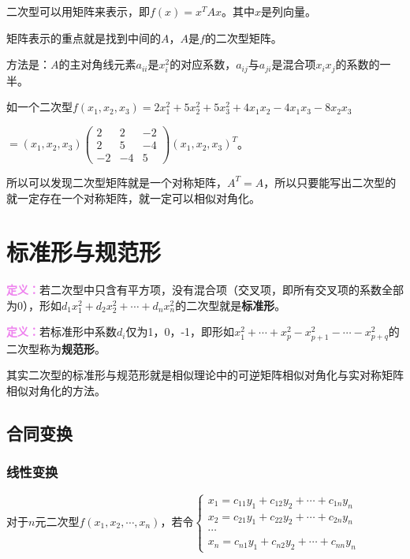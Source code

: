 二次型可以用矩阵来表示，即$f(x)=x^TAx$。其中$x$是列向量。

矩阵表示的重点就是找到中间的$A$，$A$是$f$的二次型矩阵。

方法是：$A$的主对角线元素$a_{ii}$是$x_i^2$的对应系数，$a_{ij}$与$a_{ji}$是混合项$x_ix_j$的系数的一半。

如一个二次型$f(x_1,x_2,x_3)=2x_1^2+5x_2^2+5x_3^2+4x_1x_2-4x_1x_3-8x_2x_3$

$=(x_1,x_2,x_3)\left(\begin{array}{ccc}
    2 & 2 & -2 \\
    2 & 5 & -4 \\
    -2 & -4 & 5
\end{array}\right)(x_1,x_2,x_3)^T$。

所以可以发现二次型矩阵就是一个对称矩阵，$A^T=A$，所以只要能写出二次型的就一定存在一个对称矩阵，就一定可以相似对角化。

\section{标准形与规范形}

\textcolor{violet}{\textbf{定义：}}若二次型中只含有平方项，没有混合项（交叉项，即所有交叉项的系数全部为0），形如$d_1x_1^2+d_2x_2^2+\cdots+d_nx_n^2$的二次型就是\textbf{标准形}。

\textcolor{violet}{\textbf{定义：}}若标准形中系数$d_i$仅为1，0，-1，即形如$x_1^2+\cdots+x_p^2-x_{p+1}^2-\cdots-x_{p+q}^2$的二次型称为\textbf{规范形}。

其实二次型的标准形与规范形就是相似理论中的可逆矩阵相似对角化与实对称矩阵相似对角化的方法。

\subsection{合同变换}

\subsubsection{线性变换}

对于$n$元二次型$f(x_1,x_2,\cdots,x_n)$，若令$\left\{\begin{array}{l}
    x_1=c_{11}y_1+c_{12}y_2+\cdots+c_{1n}y_n \\
    x_2=c_{21}y_1+c_{22}y_2+\cdots+c_{2n}y_n \\
    \cdots \\
    x_n=c_{n1}y_1+c_{n2}y_2+\cdots+c_{nn}y_n
\end{array}\right.$

